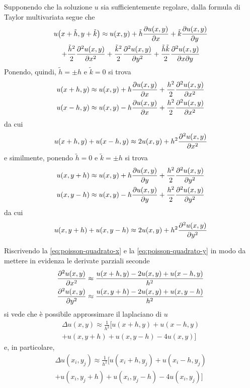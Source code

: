 	Supponendo che la soluzione \(u\) sia sufficientemente regolare, dalla formula di Taylor multivariata segue che
	\begin{multline*}
		u \qty(x + \tilde{h}, y + \tilde{k}) \approx u (x, y) + \tilde{h} \pdv{u (x, y)}{x} + \tilde{k} \pdv{u (x, y)}{y} \\
		+ \frac{\tilde{h}^2}{2} \pdv[2]{u (x, y)}{x} + \frac{\tilde{k}^2}{2} \pdv[2]{u (x, y)}{y} + \frac{\tilde{h} \tilde{k}}{2} \pdv[2]{u (x, y)}{x}{y}
	\end{multline*}
	Ponendo, quindi, \(\tilde{h} = \pm h\) e \(\tilde{k} = 0\) si trova
	\begin{align*}
		u (x + h, y) &\approx u (x, y) + h \pdv{u (x, y)}{x} + \frac{h^2}{2} \pdv[2]{u (x, y)}{x} \\
		u (x - h, y) &\approx u (x, y) - h \pdv{u (x, y)}{x} + \frac{h^2}{2} \pdv[2]{u (x, y)}{x}
	\end{align*}
	da cui
	\begin{equation}\label{eq:poisson-quadrato-x}
		u (x + h, y) + u (x - h, y) \approx 2 u (x, y) + h^2 \pdv[2]{u (x, y)}{x}
	\end{equation}
	e similmente, ponendo \(\tilde{h} = 0\) e \(\tilde{k} = \pm h\) si trova
	\begin{align*}
		u (x, y + h) &\approx u (x, y) + h \pdv{u (x, y)}{y} + \frac{h^2}{2} \pdv[2]{u (x, y)}{y} \\
		u (x, y - h) &\approx u (x, y) - h \pdv{u (x, y)}{y} + \frac{h^2}{2} \pdv[2]{u (x, y)}{y}
	\end{align*}
	da cui
	\begin{equation}\label{eq:poisson-quadrato-y}
		u (x, y + h) + u (x, y - h) \approx 2 u (x, y) + h^2 \pdv[2]{u (x, y)}{y}
	\end{equation}
	
	Riscrivendo la \eqref{eq:poisson-quadrato-x} e la \eqref{eq:poisson-quadrato-y} in modo da mettere in evidenza le derivate parziali seconde
	\begin{align*}
		\pdv[2]{u (x, y)}{x} &\approx \frac{u (x + h, y) - 2 u (x, y) + u (x - h, y)}{h^2} \\
		\pdv[2]{u (x, y)}{y} &\approx \frac{u (x, y + h) - 2 u (x, y) + u (x, y - h)}{h^2}
	\end{align*}
	si vede che è possibile approssimare il laplaciano di \(u\)
	\begin{multline}
		\Delta u (x, y) \approx \frac{1}{h^2} [u (x + h, y) + u (x - h, y) \\
		+ u (x, y + h) + u (x, y - h) - 4 u (x, y)]
	\end{multline}
	e, in particolare,
	\begin{multline*}
		\Delta u (x_i, y_j) \approx \frac{1}{h^2} [u (x_i + h, y_j) + u (x_i - h, y_j) \\
		+ u (x_i, y_j + h) + u (x_i, y_j - h) - 4 u (x_i, y_j)]
	\end{multline*}

